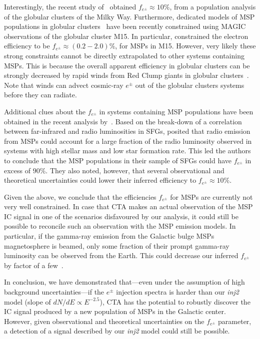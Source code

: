 \documentclass[doublespace,nopageskip]{VTthesis} %
\begin{document}
Interestingly, the recent study of~\citet{Song:2021zrs} obtained $f_{e^\pm}\approx 10\%$, from a population analysis of the globular clusters of the Milky Way. Furthermore, dedicated models of MSP populations in globular clusters~\citep{Bednarek:2016gpp,Ndiyavala:2017hoh} have been recently constrained using MAGIC observations of the globular cluster M15. In particular, \cite{Acciari:2019ysf} constrained the electron efficiency to be $f_{e^{\pm}}\approx (0.2-2.0)\%$, for MSPs in M15. However, very likely these strong constraints cannot be directly extrapolated to other systems containing MSPs. This is because the overall apparent efficiency in globular clusters can be strongly decreased by rapid winds from Red Clump giants in globular clusters~\citep{Bednarek:2016gpp}. Note that winds can advect cosmic-ray $e^\pm$ out of the globular clusters systems before they can radiate.

Additional clues about the $f_{e^{\pm}}$ in systems containing MSP populations have been obtained in the recent analysis by~\citet{Sudoh:2020hyu}. 
%
Based on the break-down of a correlation 
between far-infrared and radio luminosities in SFGs, \citet{Sudoh:2020hyu} posited that radio emission from MSPs could account for a large fraction of the radio luminosity observed in systems with high stellar mass and low star formation rate. This led the authors to conclude that the MSP populations in their sample of SFGs could have $f_{e^{\pm}}$ in excess of $90\%$. They also noted, however, that several observational and theoretical uncertainties could lower their inferred efficiency to $f_{e^{\pm}}\approx 10\%$. 

 

Given the above, 
we conclude that the efficiencies $f_{e^{\pm}}$ for MSPs are currently not very well constrained. In case that CTA makes an actual observation of the MSP IC signal in one of the scenarios disfavoured by our analysis, it could still be possible to reconcile such an observation with the MSP emission models. In particular, if the gamma-ray emission from the Galactic bulge MSPs magnetosphere is beamed, only some fraction of their prompt gamma-ray luminosity can be observed from the Earth. This could decrease our inferred $f_{e^{\pm}}$ by factor of a few~\citep{Sudoh:2020hyu}.  

In conclusion, we have demonstrated that---even under the assumption of high background uncertainties---if the $e^\pm$ injection spectra is harder than our \textit{inj2} model (slope of $dN/dE \propto E^{-2.5}$),  CTA has the potential to robustly discover the IC signal produced by a new population of MSPs in the Galactic center. However, given observational and theoretical uncertainties on the $f_{e^{\pm}}$ parameter, a detection of a signal described by our \textit{inj2} model could still be possible. 
\end{document}
